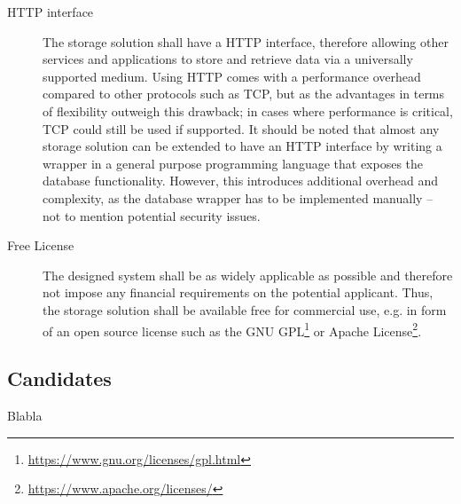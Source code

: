 \begin{description}
\item [HTTP interface]
The storage solution shall have a HTTP interface, therefore allowing other services and applications to store and retrieve data via a universally supported medium.
Using HTTP comes with a performance overhead compared to other protocols such as TCP, but as  the advantages in terms of flexibility outweigh this drawback; in cases where performance is critical, TCP could still be used if supported.
It should be noted that almost any storage solution can be extended to have an HTTP interface by writing a wrapper in a general purpose programming language that exposes the database functionality.
However, this introduces additional overhead and complexity, as the database wrapper has to be implemented manually -- not to mention potential security issues.
\item [Free License]
The designed system shall be as widely applicable as possible and therefore not impose any financial requirements on the potential applicant.
Thus, the storage solution shall be available free for commercial use, e.g. in form of an open source license such as the GNU GPL\footnote{\url{https://www.gnu.org/licenses/gpl.html}} or Apache License\footnote{\url{https://www.apache.org/licenses/}}.
\end{description}


\subsection{Candidates}

Blabla

